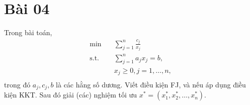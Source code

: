 \section{Bài 04}

Trong bài toán,
\begin{equation}
    \begin{aligned}
        \min \quad & \sum_{j=1}^n\frac{c_j}{x_j}\\
        \textrm{s.t.} \quad & \sum_{j=1}^na_jx_j = b,\\
          &x_j \geq 0, j = 1, \dots, n,  \\
    \end{aligned}
\end{equation}
trong đó $a_j, c_j, b$ là các hằng số dương. Viết điều kiện FJ, và nếu áp dụng điều kiện KKT. Sau đó giải (các) nghiệm tối ưu $x^{*} = (x^{*}_1, x^{*}_2, \dots, x^{*}_n)$.

